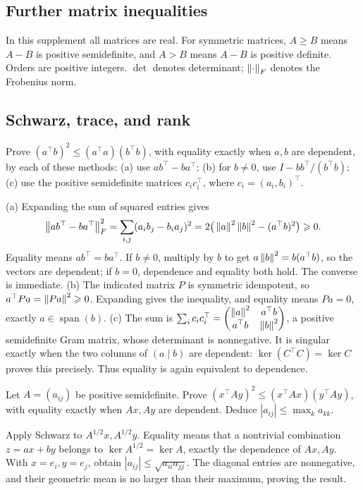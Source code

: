 \subsection*{Further matrix inequalities}
In this supplement all matrices are real. For symmetric matrices,
\(A\geqslant B\) means \(A-B\) is positive semidefinite, and
\(A>B\) means \(A-B\) is positive definite. Orders are positive integers.
\(\det\) denotes determinant; \(\left\lVert\cdot\right\rVert_F\) denotes the Frobenius norm.

\subsection*{Schwarz, trace, and rank}

\begin{problem}\label{ex:12:ineq-ma-01}
Prove \((a^\top b)^2\leqslant(a^\top a)(b^\top b)\), with equality
exactly when \(a,b\) are dependent, by each of these methods:
(a) use \(ab^\top-ba^\top\); (b) for \(b\ne0\), use
\(I-bb^\top/(b^\top b)\); (c) use the positive semidefinite matrices
\(c_ic_i^\top\), where \(c_i=(a_i,b_i)^\top\).
\end{problem}
\begin{solution}
(a) Expanding the sum of squared entries gives
\[
\left\lVert ab^\top-ba^\top\right\rVert_F^2
=\sum_{i,j}(a_i b_j-b_i a_j)^2
=2\big(\left\lVert a\right\rVert^2\left\lVert b\right\rVert^2-(a^\top b)^2\big)\geqslant0.
\]
Equality means \(ab^\top=ba^\top\). If \(b\ne0\), multiply by \(b\)
to get \(a\left\lVert b\right\rVert^2=b(a^\top b)\), so the vectors are dependent;
if \(b=0\), dependence and equality both hold. The converse is immediate.
(b) The indicated matrix \(P\) is symmetric idempotent, so
\(a^\top Pa=\left\lVert Pa\right\rVert^2\geqslant0\). Expanding gives the inequality,
and equality means \(Pa=0\), exactly \(a\in\operatorname{span}(b)\).
(c) The sum is
\(\sum_i c_ic_i^\top=\begin{pmatrix}\left\lVert a\right\rVert^2&a^\top b\\a^\top b&\left\lVert b\right\rVert^2\end{pmatrix}\),
a positive semidefinite Gram matrix, whose determinant is nonnegative.
It is singular exactly when the two columns of \((a\mid b)\) are
dependent: \(\ker(C^\top C)=\ker C\) proves this precisely.
Thus equality is again equivalent to dependence.
\end{solution}

\begin{problem}\label{ex:12:ineq-ma-02}
Let \(A=(a_{ij})\) be positive semidefinite. Prove
\((x^\top Ay)^2\leqslant(x^\top Ax)(y^\top Ay)\), with equality
exactly when \(Ax,Ay\) are dependent. Deduce
\(|a_{ij}|\leqslant\max_k a_{kk}\).
\end{problem}
\begin{solution}
Apply Schwarz to \(A^{1/2}x,A^{1/2}y\).
Equality means that a nontrivial combination \(z=ax+by\) belongs to
\(\ker A^{1/2}=\ker A\), exactly the dependence of \(Ax,Ay\).
With \(x=e_i,y=e_j\), obtain \(|a_{ij}|\leqslant\sqrt{a_{ii}a_{jj}}\).
The diagonal entries are nonnegative, and their geometric mean is no
larger than their maximum, proving the result.
\end{solution}

